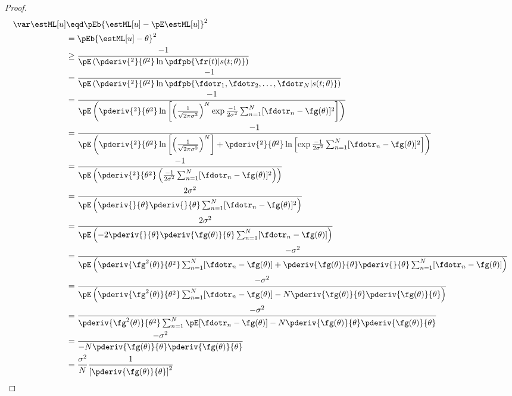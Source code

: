 \begin{proof}
\begin{align*}
   \var\estML[u]
     &\eqd \pEb{\estML[u]-\pE\estML[u]}^2
   \\&= \pEb{\estML[u]-\theta}^2
   \\&\ge \frac{-1}{\pE\left(
              \pderiv{^2}{\theta^2} \ln \pdfpb{\fr(t)|s(t;\theta)}
           \right)}
   \\&=   \frac{-1}{\pE\left(
              \pderiv{^2}{\theta^2} \ln
              \pdfpb{\fdotr_1, \fdotr_2,\ldots,\fdotr_N|s(t;\theta)}
           \right)}
   \\&=   \frac{-1}{\pE\left(
              \pderiv{^2}{\theta^2} \ln\left[
              \left(\frac{1}{\sqrt{2\pi\sigma^2}} \right)^N
              \exp{\frac{-1}{2\sigma^2}\sum_{n=1}^N [\fdotr_n-\fg(\theta)]^2 }\right]
           \right)}
   \\&=   \frac{-1}{\pE\left(
              \pderiv{^2}{\theta^2} \ln\left[
              \left(\frac{1}{\sqrt{2\pi\sigma^2}} \right)^N \right]
              +
              \pderiv{^2}{\theta^2} \ln\left[
              \exp{\frac{-1}{2\sigma^2}\sum_{n=1}^N [\fdotr_n-\fg(\theta)]^2 }\right]
           \right)}
  \\&=   \frac{-1}{\pE\left(
             \pderiv{^2}{\theta^2}
             \left(\frac{-1}{2\sigma^2}\sum_{n=1}^N [\fdotr_n-\fg(\theta)]^2 \right)
          \right)}
  \\&=   \frac{2\sigma^2}{\pE\left(
             \pderiv{}{\theta} \pderiv{}{\theta}
             \sum_{n=1}^N [\fdotr_n-\fg(\theta)]^2
          \right)}
  \\&=   \frac{2\sigma^2}{\pE\left(
             -2\pderiv{}{\theta}
             \pderiv{\fg(\theta)}{\theta}
             \sum_{n=1}^N [\fdotr_n-\fg(\theta)]
          \right)}
  \\&=   \frac{-\sigma^2}{\pE\left(
             \pderiv{\fg^2(\theta)}{\theta^2}
             \sum_{n=1}^N [\fdotr_n-\fg(\theta)]
             +
             \pderiv{\fg(\theta)}{\theta}
             \pderiv{}{\theta}
             \sum_{n=1}^N [\fdotr_n-\fg(\theta)]
          \right)}
   \\&=   \frac{-\sigma^2}{\pE\left(
              \pderiv{\fg^2(\theta)}{\theta^2}
              \sum_{n=1}^N [\fdotr_n-\fg(\theta)]
              -N
              \pderiv{\fg(\theta)}{\theta}
              \pderiv{\fg(\theta)}{\theta}
           \right)}
   \\&=   \frac{-\sigma^2}{
              \pderiv{\fg^2(\theta)}{\theta^2}
              \sum_{n=1}^N \pE[\fdotr_n-\fg(\theta)]
              -N
              \pderiv{\fg(\theta)}{\theta}
              \pderiv{\fg(\theta)}{\theta}
           }
   \\&=   \frac{-\sigma^2}{
              -N
              \pderiv{\fg(\theta)}{\theta}
              \pderiv{\fg(\theta)}{\theta}
           }
   \\&=   \frac{\sigma^2}{N}
           \frac{1}{\left[ \pderiv{\fg(\theta)}{\theta} \right]^2}
\end{align*}


\end{proof}
